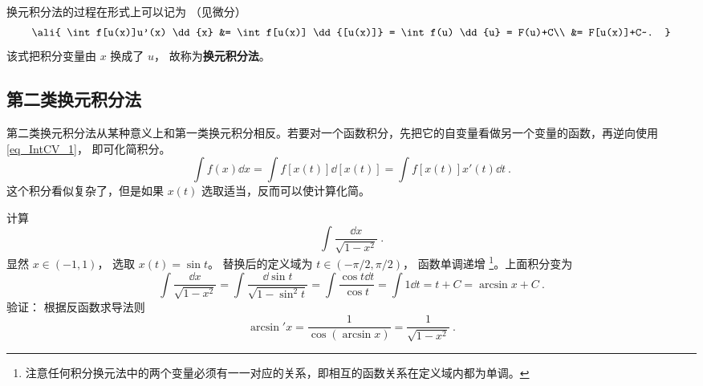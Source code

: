 换元积分法的过程在形式上可以记为 （见微分）
\begin{equation}\label{eq_IntCV_1}
\ali{
\int f[u(x)]u'(x) \dd{x} &= \int f[u(x)] \dd{[u(x)]} = \int f(u) \dd{u} = F(u)+C\\
&= F[u(x)]+C~.
}\end{equation}
该式把积分变量由 $x$ 换成了 $u$， 故称为\textbf{换元积分法}。

\subsection{第二类换元积分法}
第二类换元积分法从某种意义上和第一类换元积分相反。若要对一个函数积分，先把它的自变量看做另一个变量的函数，再逆向使用\autoref{eq_IntCV_1}， 即可化简积分。
\begin{equation}\label{eq_IntCV_6}
\int f(x) \dd{x} = \int f[x(t)] \dd{[x(t)]} = \int f[x(t)]x'(t) \dd{t}~.
\end{equation}
这个积分看似复杂了，但是如果 $x(t)$ 选取适当，反而可以使计算化简。

\begin{example}{}
计算
\begin{equation}
\int \frac{\dd{x}}{\sqrt{1-x^2}}~.
\end{equation}
显然 $x \in ( - 1,1)$， 选取 $x(t)=\sin t$。 替换后的定义域为 $t \in ( -\pi/2,\pi/2)$， 函数单调递增 \footnote{注意任何积分换元法中的两个变量必须有一一对应的关系，即相互的函数关系在定义域内都为单调。}。上面积分变为
\begin{equation}
\int \frac{\dd{x}}{\sqrt{1-x^2}}  = \int \frac{\dd{\sin t}}{\sqrt{1-\sin^2 t}} = \int \frac{\cos t\dd{t}}{\cos t}  = \int 1\dd{t}  = t + C = \arcsin x + C~.
\end{equation}
验证： 根据反函数求导法则
\begin{equation}
\arcsin'x = \frac{1}{\cos(\arcsin x)} = \frac{1}{\sqrt {1 - {x^2}} }~.
\end{equation}
\end{example}




